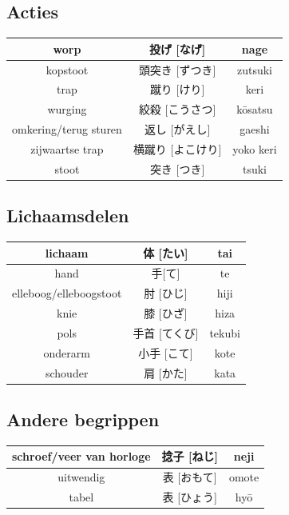 \documentclass[12pt]{scrartcl}
\begin{document}
\begin{CJK*}{UTF8}{min}
\subsection{Acties}
\begin{table}[H]
\begin{center}
\begin{tabular}{c|c|c}
worp & 投げ [なげ] & nage\\
\hline
kopstoot & 頭突き [ずつき] & zutsuki\\
\hline
trap & 蹴り [けり] & keri\\
\hline
wurging & 絞殺 [こうさつ] & k\={o}satsu\\
\hline
omkering/terug sturen & 返し [がえし] & gaeshi\\
\hline
zijwaartse trap & 横蹴り [よこけり] & yoko keri\\
\hline
stoot & 突き [つき] & tsuki
\end{tabular}
\end{center}
\end{table}

\subsection{Lichaamsdelen}
\begin{table}[H]
\begin{center}
\begin{tabular}{c|c|c}
lichaam & 体 [たい] & tai \\
\hline
hand & 手[て] & te \\
\hline
elleboog/elleboogstoot & 肘 [ひじ] & hiji\\
\hline
knie & 膝 [ひざ] & hiza\\
\hline
pols & 手首 [てくび] & tekubi\\
\hline
onderarm & 小手 [こて] & kote\\
\hline
schouder & 肩 [かた] & kata
\end{tabular}
\end{center}
\end{table}

\subsection{Andere begrippen}
\begin{table}[H]
\begin{center}
\begin{tabular}{c|c|c}
schroef/veer van horloge & 捻子 [ねじ] & neji\\
\hline
uitwendig & 表 [おもて] & omote\\
\hline
tabel & 表 [ひょう] & hy\={o}
\end{tabular}
\end{center}
\end{table}


\end{CJK*}
\end{document}
